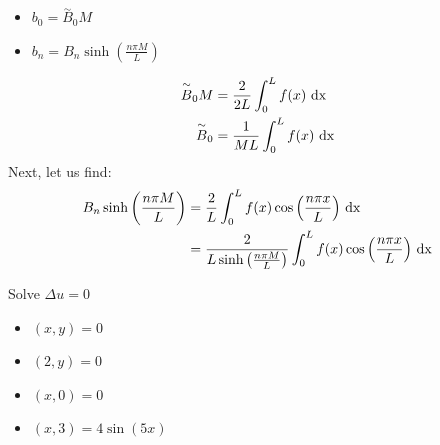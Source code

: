 \documentclass{article}
\newcommand{\twiddle}[1]{\overset{\sim}{#1}}
\begin{document}
\begin{enumerate}
\begin{itemize}
  \item $b_0 = \twiddle B_0 M$
  \item $b_n = B_n \sinh\left( \frac{n \pi M}{L} \right)$
\end{itemize}
\begin{align}
  \twiddle B_0 M & = \frac{2}{2L} \int^L_0 f(x) \dx\\
  \twiddle B_0 & = \frac{1}{ML} \int^L_0 f(x) \dx
\end{align}
Next, let us find:
\begin{align}
  B_n \sinh\left( \frac{n \pi M}{L} \right) & = \frac{2}{L} \int^L_0 f(x) \cos \Big( \frac{n \pi x}{L} \Big) \text{ dx }\\
  & = \frac{2}{L \sinh\left( \frac{n \pi M}{L} \right)} \int^L_0 f(x) \cos \Big( \frac{n \pi x}{L} \Big) \text{ dx }
\end{align}
\end{enumerate}
\ex Solve $\Delta u = 0$
\begin{itemize}
  \item $(x, y) = 0$
  \item $(2, y) = 0$
  \item $(x, 0) = 0$
  \item $(x, 3) = 4 \sin (5x)$
\end{itemize}
\end{document}
